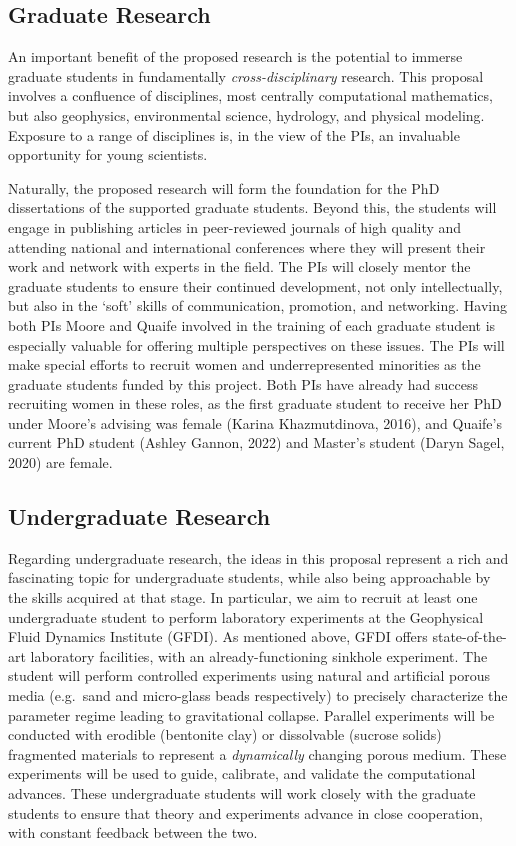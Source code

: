 \documentclass[11pt]{article}
\begin{document}
\subsection{Graduate Research}
An important benefit of the proposed research is the potential to immerse graduate students in fundamentally {\em cross-disciplinary} research. This proposal involves a confluence of disciplines, most centrally computational mathematics, but also geophysics, environmental science, hydrology, and physical modeling. Exposure to a range of disciplines is, in the view of the PIs, an invaluable opportunity for young scientists.  

Naturally, the proposed research will form the foundation for the PhD dissertations of the supported graduate students. Beyond this, the students will engage in publishing articles in peer-reviewed journals of high quality and attending national and international conferences where they will present their work and network with experts in the field. The PIs will closely mentor the graduate students to ensure their continued development, not only intellectually, but also in the `soft' skills of communication, promotion, and networking. Having both PIs Moore and Quaife involved in the training of each graduate student is especially valuable for offering multiple perspectives on these issues. The PIs will make special efforts to recruit women and underrepresented minorities as the graduate students funded by this project. Both PIs have already had success recruiting women in these roles, as the first graduate student to receive her PhD under Moore's advising was female (Karina Khazmutdinova, 2016), and Quaife's current PhD student (Ashley Gannon, 2022) and Master's student (Daryn Sagel, 2020) are female.


\subsection{Undergraduate Research}
Regarding undergraduate research, the ideas in this proposal represent a rich and fascinating topic for undergraduate students, while also being approachable by the skills acquired at that stage. In particular, we aim to recruit at least one undergraduate student to perform laboratory experiments at the Geophysical Fluid Dynamics Institute (GFDI). As mentioned above, GFDI offers state-of-the-art laboratory facilities, with an already-functioning sinkhole experiment. The student will perform controlled experiments using natural and artificial porous media (e.g.~sand and micro-glass beads respectively) to precisely characterize the parameter regime leading to gravitational collapse. Parallel experiments will be conducted with erodible (bentonite clay) or dissolvable  (sucrose solids) fragmented materials to represent a {\em dynamically} changing porous medium. These experiments will be used to guide, calibrate, and validate the computational advances. These undergraduate students will work closely with the graduate students to ensure that theory and experiments advance in close cooperation, with constant feedback between the two.
\end{document}
